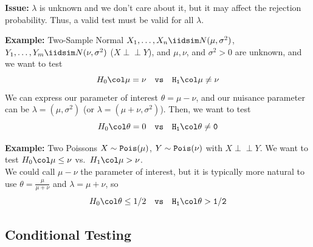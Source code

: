 \textbf{Issue:} $\lambda$ is unknown and we don't care about it, but it may affect the rejection probability. Thus, a valid test must be valid for all $\lambda$.

\begin{example}{\textbf{Example:} Two-Sample Normal}
    $X_1, \ldots, X_n \iidsim N(\mu, \sigma^2)$, $Y_1, \ldots, Y_m \iidsim N(\nu, \sigma^2)$ ($X \perp\!\!\!\perp Y$), and $\mu, \nu$, and $\sigma^2 > 0$ are unknown, and we want to test
    \[ H_0 \col \mu = \nu \quad \tt{vs} \quad H_1 \col \mu \neq \nu \]
    We can express our parameter of interest $\theta = \mu - \nu$, and our nuisance parameter can be $\lambda = (\mu, \sigma^2)$ (or $\lambda = (\mu + \nu, \sigma^2)$). Then, we want to test
    \[ H_0 \col \theta = 0 \quad \tt{vs} \quad H_1 \col \theta \neq 0 \]
\end{example}

\begin{example}{\textbf{Example:} Two Poissons}
    $X \sim \tt{Pois}(\mu)$, $Y \sim \tt{Pois}(\nu)$ with $X \perp\!\!\!\perp Y$. We want to test $H_0 \col \mu \leq \nu$ vs.\ $H_1 \col \mu > \nu$.\\

    We could call $\mu - \nu$ the parameter of interest, but it is typically more natural to use $\theta = \frac{\mu}{\mu + \nu}$ and $\lambda = \mu + \nu$, so
    \[ H_0 \col \theta \leq 1/2 \quad \tt{vs} \quad H_1 \col \theta > 1/2 \]
\end{example}

\subsection*{Conditional Testing}
\sectionspace

